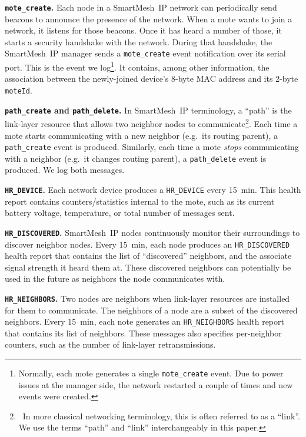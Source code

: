 \documentclass{elsarticle}
\newcommand{\smip}                {SmartMesh~IP\xspace}
\newcommand{\HRNEIGHBORS}         {{\tt HR\_NEIGHBORS}\xspace}
\newcommand{\HRDISCOVERED}        {{\tt HR\_DISCOVERED}\xspace}
\newcommand{\HRDEVICE}            {{\tt HR\_DEVICE}\xspace}
\newcommand{\pathcreate}          {{\tt path\_create}\xspace}
\newcommand{\pathdelete}          {{\tt path\_delete}\xspace}
\newcommand{\motecreate}          {{\tt mote\_create}\xspace}
\newcommand{\moteId}              {{\tt moteId}\xspace}
\begin{document}
\textbf{\motecreate.}
Each node in a \smip network can periodically send beacons to announce the presence of the network.
When a mote wants to join a network, it listens for those beacons.
Once it has heard a number of those, it starts a security handshake with the network.
During that handshake, the \smip manager sends a \motecreate event notification over its serial port.
This is the event we log\footnote{Normally, each mote generates a single \motecreate event. Due to power issues at the manager side, the network restarted a couple of times and new events were created.}.
It contains, among other information, the association between the newly-joined device's 8-byte MAC address and its 2-byte \moteId.

\textbf{\pathcreate and \pathdelete.}
In \smip terminology, a ``path'' is the link-layer resource that allows two neighbor nodes to communicate\footnote{~In more classical networking terminology, this is often referred to as a ``link''. We use the terms ``path'' and ``link'' interchangeably in this paper.}.
Each time a mote starts communicating with a new neighbor (e.g.~its routing parent), a \pathcreate event is produced.
Similarly, each time a mote \textit{stops} communicating with a neighbor (e.g.~it changes routing parent), a \pathdelete event is produced.
We log both messages.

\textbf{\HRDEVICE.}
Each network device produces a \HRDEVICE every 15~min.
This health report contains counters/statistics internal to the mote, such as its current battery voltage, temperature, or total number of messages sent.

\textbf{\HRDISCOVERED.}
\smip nodes continuously monitor their surroundings to discover neighbor nodes.
Every 15~min, each node produces an \HRDISCOVERED health report that contains the list of ``discovered'' neighbors, and the associate signal strength it heard them at.
These discovered neighbors can potentially be used in the future as neighbors the node communicates with.

\textbf{\HRNEIGHBORS.}
Two nodes are neighbors when link-layer resources are installed for them to communicate.
The neighbors of a node are a subset of the discovered neighbors.
Every 15~min, each note generates an \HRNEIGHBORS health report that contains its list of neighbors.
These messages also specifies per-neighbor counters, such as the number of link-layer retransmissions.
\end{document}
